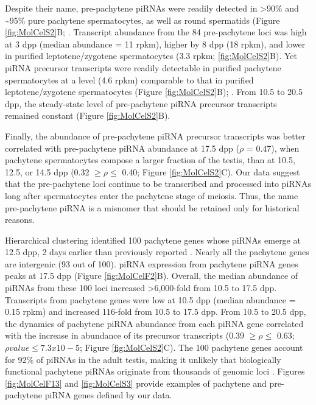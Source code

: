     Despite their name, pre-pachytene piRNAs were readily detected in >90\% and \textasciitilde95\% pure pachytene spermatocytes, as well as round spermatids (Figure \ref{fig:MolCelS2}B; \citep{Gan2011,Modzelewski2012}. Transcript abundance from the 84 pre-pachytene loci was high at 3 dpp (median abundance = 11 rpkm), higher by 8 dpp (18 rpkm), and lower in purified leptotene/zygotene spermatocytes (3.3 rpkm; \ref{fig:MolCelS2}B). Yet piRNA precursor transcripts were readily detectable in purified pachytene spermatocytes at a level (4.6 rpkm) comparable to that in purified leptotene/zygotene spermatocytes (Figure \ref{fig:MolCelS2}B);  \citep{Gan2011,Modzelewski2012}. From 10.5 to 20.5 dpp, the steady-state level of pre-pachytene piRNA precursor transcripts remained constant (Figure \ref{fig:MolCelS2}B).

    Finally, the abundance of pre-pachytene piRNA precursor transcripts was better correlated with pre-pachytene piRNA abundance at 17.5 dpp ($\rho$ = 0.47), when pachytene spermatocytes compose a larger fraction of the testis, than at 10.5, 12.5, or 14.5 dpp (0.32 $\ge \rho \le$ 0.40; Figure \ref{fig:MolCelS2}C). Our data suggest that the pre-pachytene loci continue to be transcribed and processed into piRNAs long after spermatocytes enter the pachytene stage of meiosis. Thus, the name pre-pachytene piRNA is a misnomer that should be retained only for historical reasons.

    Hierarchical clustering identified 100 pachytene genes whose piRNAs emerge at 12.5 dpp, 2 days earlier than previously reported \citep{Girard2006}. Nearly all the pachytene genes are intergenic (93 out of 100). piRNA expression from pachytene piRNA genes peaks at 17.5 dpp (Figure \ref{fig:MolCelF2}B). Overall, the median abundance of piRNAs from these 100 loci increased >6,000-fold from 10.5 to 17.5 dpp. Transcripts from pachytene genes were low at 10.5 dpp (median abundance = 0.15 rpkm) and increased 116-fold from 10.5 to 17.5 dpp. From 10.5 to 20.5 dpp, the dynamics of pachytene piRNA abundance from each piRNA gene correlated with the increase in abundance of its precursor transcripts (0.39 $\ge \rho \le$  0.63; $\rho value \le 7.3 x 10-5$; Figure \ref{fig:MolCelS2}C). The 100 pachytene genes account for 92\% of piRNAs in the adult testis, making it unlikely that biologically functional pachytene piRNAs originate from thousands of genomic loci \citep{Gan2011}. Figures \ref{fig:MolCelF13} and \ref{fig:MolCelS3} provide examples of pachytene and pre-pachytene piRNA genes defined by our data.

